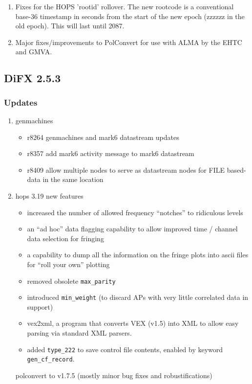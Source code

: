 \begin{enumerate}

\item Fixes for the HOPS 'rootid' rollover.  The new rootcode is a conventional base-36 timestamp in seconds from the start of the new epoch (zzzzzz in the old epoch).  This will last until 2087.
\item Major fixes/improvements to PolConvert for use with ALMA by the EHTC and GMVA.

\end{enumerate}


\subsection{DiFX 2.5.3}

\subsubsection{Updates}

\begin{enumerate}

\item genmachines
\begin{itemize}
  \item r8264 genmachines and mark6 datastream updates
  \item r8357 add mark6 activity message to mark6 datastream
  \item r8409 allow multiple nodes to serve as datastream nodes for FILE based-data in the same location
\end{itemize}
\item hops 3.19 new features
\begin{itemize}
  \item increased the number of allowed frequency ``notches'' to ridiculous levels
  \item an “ad hoc” data flagging capability to allow improved time / channel data selection for fringing
  \item a capability to dump all the information on the fringe plots into ascii files for “roll your own” plotting
  \item removed obsolete {\tt max\_parity}
  \item introduced {\tt min\_weight} (to discard APs with very little correlated data in support)
  \item vex2xml, a program that converts VEX (v1.5) into XML to allow easy parsing via standard XML parsers.
  \item added {\tt type\_222} to save control file contents, enabled by keyword {\tt gen\_cf\_record}.
\end{itemize}
    polconvert to v1.7.5 (mostly minor bug fixes and robustifications)
\end{enumerate}

